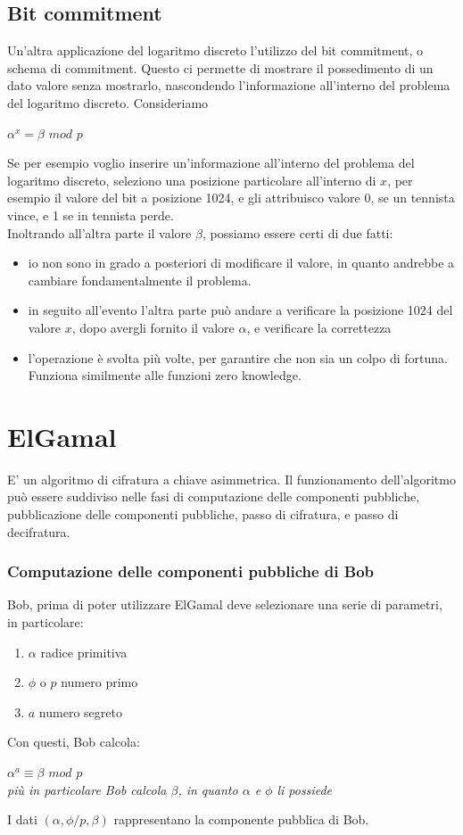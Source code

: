 \documentclass[11pt, oneside]{article}   	%
\begin{document}
\subsection*{Bit commitment}
Un'altra applicazione del logaritmo discreto l'utilizzo del bit commitment, o schema di commitment. Questo ci permette di mostrare il possedimento di un dato valore senza mostrarlo, nascondendo l'informazione all'interno del problema del logaritmo discreto. Consideriamo
\begin{center}
$\alpha^x = \beta$ $mod$ $p$
\end{center}
Se per esempio voglio inserire un'informazione all'interno del problema del logaritmo discreto, seleziono una posizione particolare all'interno di $x$, per esempio il valore del bit a posizione 1024, e gli attribuisco valore 0, se un tennista vince, e 1 se in tennista perde.\\

Inoltrando all'altra parte il valore $\beta$, possiamo essere certi di due fatti:
\begin{itemize}
\item io non sono in grado a posteriori di modificare il valore, in quanto andrebbe a cambiare fondamentalmente il problema.
\item in seguito all'evento l'altra parte può andare a verificare la posizione 1024 del valore $x$, dopo avergli fornito il valore $\alpha$, e verificare la correttezza
\item l'operazione è svolta più volte, per garantire che non sia un colpo di fortuna. Funziona similmente alle funzioni zero knowledge.
\end{itemize}

\section*{ElGamal}
E' un algoritmo di cifratura a chiave asimmetrica. Il funzionamento dell'algoritmo può essere suddiviso nelle fasi di computazione delle componenti pubbliche, pubblicazione delle componenti pubbliche, passo di cifratura, e passo di decifratura.
\subsubsection*{Computazione delle componenti pubbliche di Bob}
Bob, prima di poter utilizzare ElGamal deve selezionare una serie di parametri, in particolare:
\begin{enumerate}
\item $\alpha$ radice primitiva
\item $\phi$ o $p$ numero primo
\item $a$ numero segreto
\end{enumerate}
Con questi, Bob calcola:
\begin{center}
$\alpha^a \equiv \beta$ $mod$ $p$\\
\emph{più in particolare Bob calcola $\beta$, in quanto $\alpha$ e $\phi$ li possiede}
\end{center}
I dati $(\alpha, \phi/p, \beta)$ rappresentano la componente pubblica di Bob.
\end{document}
